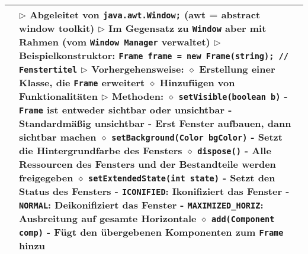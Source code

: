 \begin{longtable}{ | p{} p{} | }
	\makecell[l]{Klasse Frame} & \makecell[l]{
	$\rhd$ Abgeleitet von \texttt{java.awt.Window;} (awt = abstract window toolkit) \\
	$\rhd$ Im Gegensatz zu \texttt{Window} aber mit Rahmen (vom \texttt{Window Manager} verwaltet) \\
	$\rhd$ Beispielkonstruktor: \texttt{Frame frame = new Frame(string); // Fenstertitel} \\
	$\rhd$ Vorhergehensweise: \\
	\hspace{0.4cm} $\diamond$ Erstellung einer Klasse, die \texttt{Frame} erweitert \\
	\hspace{0.4cm} $\diamond$ Hinzufügen von Funktionalitäten \\
	$\rhd$ Methoden: \\
	\hspace{0.4cm} $\diamond$ \texttt{setVisible(boolean b)} \\ 
	\hspace{0.6cm} - \texttt{Frame} ist entweder sichtbar oder unsichtbar \\ 
	\hspace{0.6cm} - Standardmä\ss ig unsichtbar \\
	\hspace{0.6cm} - Erst Fenster aufbauen, dann sichtbar machen \\
	\hspace{0.4cm} $\diamond$ \texttt{setBackground(Color bgColor)} \\
	\hspace{0.6cm} - Setzt die Hintergrundfarbe des Fensters \\
	\hspace{0.4cm} $\diamond$ \texttt{dispose()} \\
	\hspace{0.6cm} - Alle Ressourcen des Fensters und der Bestandteile werden freigegeben \\
	\hspace{0.4cm} $\diamond$ \texttt{setExtendedState(int state)} \\
	\hspace{0.6cm} - Setzt den Status des Fensters \\
	\hspace{0.6cm} - \texttt{ICONIFIED}: Ikonifiziert das Fenster \\
	\hspace{0.6cm} - \texttt{NORMAL}: Deikonifiziert das Fenster \\
	\hspace{0.6cm} - \texttt{MAXIMIZED\_HORIZ}: Ausbreitung auf gesamte Horizontale \\
	\hspace{0.4cm} $\diamond$ \texttt{add(Component comp)} \\
	\hspace{0.6cm} - Fügt den übergebenen Komponenten zum \texttt{Frame} hinzu \\
	} \\ \hline


\end{longtable}
